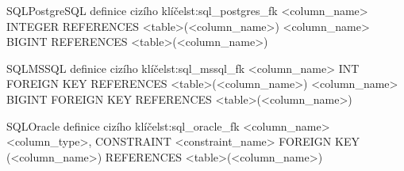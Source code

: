 \newpage

\begin{code}{SQL}{PostgreSQL definice cizího klíče}{lst:sql_postgres_fk}
    <column_name> INTEGER REFERENCES <table>(<column_name>)
    <column_name> BIGINT REFERENCES <table>(<column_name>)
\end{code}

\begin{code}{SQL}{MSSQL definice cizího klíče}{lst:sql_mssql_fk}
    <column_name> INT FOREIGN KEY REFERENCES 
        <table>(<column_name>)
    <column_name> BIGINT FOREIGN KEY REFERENCES 
        <table>(<column_name>)
\end{code}

\begin{code}{SQL}{Oracle definice cizího klíče}{lst:sql_oracle_fk}
    <column_name> <column_type>,
    CONSTRAINT <constraint_name> FOREIGN KEY (<column_name>) 
        REFERENCES <table>(<column_name>)
\end{code}